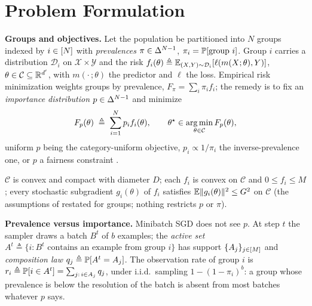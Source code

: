 \section{Problem Formulation}
\label{sec:setup}

\noindent\textbf{Groups and objectives.}
Let the population be partitioned into $N$ groups indexed by $i\in[N]$
with \emph{prevalences} $\pi\in\Delta^{N-1}$, $\pi_i=\mathbb{P}[\text{group }i]$.
Group $i$ carries a distribution $\mathcal{D}_i$ on
$\mathcal{X}\times\mathcal{Y}$ and the risk
$f_i(\theta)\triangleq\mathbb{E}_{(X,Y)\sim\mathcal{D}_i}[\ell(m(X;\theta),Y)]$,
$\theta\in\mathcal{C}\subseteq\mathbb{R}^{d'}$, with $m(\cdot\,;\theta)$ the
predictor and $\ell$ the loss. Empirical risk minimization weights
groups by prevalence, $F_\pi=\sum_i\pi_i f_i$; the remedy is to fix an
\emph{importance distribution}
$p\in\Delta^{N-1}$ and minimize
\begin{equation}
F_p(\theta)\;\triangleq\;\sum_{i=1}^{N}p_i f_i(\theta),
\qquad
\theta^\star\in\operatorname*{arg\,min}_{\theta\in\mathcal{C}}F_p(\theta),
\label{eq:target}
\end{equation}
uniform $p$ being the category-uniform objective, $p_i\propto 1/\pi_i$ the
inverse-prevalence one, or $p$ a fairness constraint
\cite{mohri2019agnostic,li2020fair}.
\begin{assumption}
\label{ass:std}
$\mathcal{C}$ is convex and compact with diameter $D$; each $f_i$ is convex
on $\mathcal{C}$ and $0\le f_i\le M$; every stochastic subgradient
$g_i(\theta)$ of $f_i$ satisfies $\mathbb{E}\|g_i(\theta)\|^2\le G^2$ on $\mathcal{C}$
(the assumptions of \cite{rahimi2025agnostic,rahimi2025fedavot} restated for
groups; nothing restricts $p$ or $\pi$).
\end{assumption}

\noindent\textbf{Prevalence versus importance.}
Minibatch SGD does not see $p$. At step $t$ the sampler draws a batch $B^t$
of $b$ examples; the \emph{active set}
$A^t\triangleq\{i: B^t\text{ contains an example from group }i\}$ has
support $\{A_j\}_{j\in[M]}$ and \emph{composition law}
$q_j\triangleq\mathbb{P}[A^t=A_j]$. The observation rate of group $i$ is
$r_i\triangleq\mathbb{P}[i\in A^t]=\sum_{j:\,i\in A_j}q_j$, under i.i.d.\ sampling
$1-(1-\pi_i)^b$: a group whose prevalence is below the resolution of the
batch is absent from most batches whatever $p$ says.


